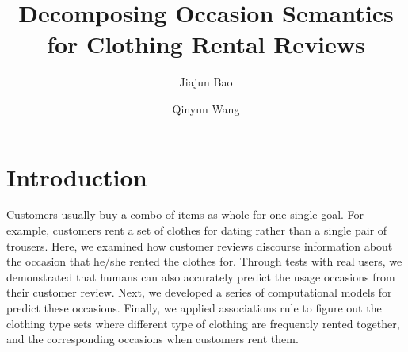 \documentclass[sigconf]{acmart}
\begin{document}
\pagestyle{plain}

\title{Decomposing Occasion Semantics for Clothing Rental Reviews}

\author{Jiajun Bao}

\author{Qinyun Wang}


\maketitle

\section{Introduction}
Customers usually buy a combo of items as whole for one single goal. For example, customers rent a set of clothes for dating rather than a single pair of trousers. Here, we examined how customer reviews discourse information about the occasion that he/she rented the clothes for. Through tests with real users, we demonstrated that humans can also accurately predict the usage occasions from their customer review. Next, we developed a series of computational models for predict these occasions. Finally, we applied associations rule to figure out the clothing type sets where different type of clothing are frequently rented together, and the corresponding occasions when customers rent them.
\end{document}
